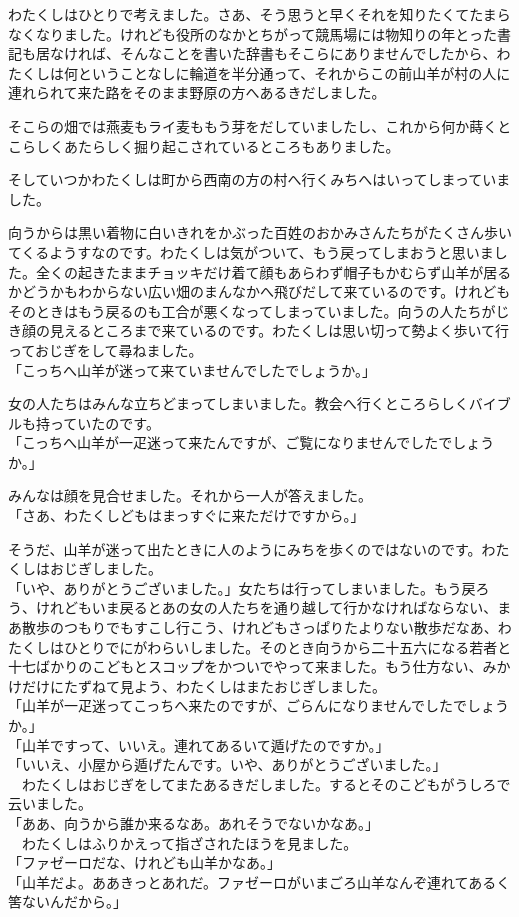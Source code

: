 わたくしはひとりで考えました。さあ、そう思うと早くそれを知りたくてたまらなくなりました。けれども役所のなかとちがって競馬場には物知りの年とった書記も居なければ、そんなことを書いた辞書もそこらにありませんでしたから、わたくしは何ということなしに輪道を半分通って、それからこの前山羊が村の人に連れられて来た路をそのまま野原の方へあるきだしました。

そこらの畑では燕麦もライ麦ももう芽をだしていましたし、これから何か蒔くとこらしくあたらしく掘り起こされているところもありました。

そしていつかわたくしは町から西南の方の村へ行くみちへはいってしまっていました。

向うからは黒い着物に白いきれをかぶった百姓のおかみさんたちがたくさん歩いてくるようすなのです。わたくしは気がついて、もう戻ってしまおうと思いました。全くの起きたままチョッキだけ着て顔もあらわず帽子もかむらず山羊が居るかどうかもわからない広い畑のまんなかへ飛びだして来ているのです。けれどもそのときはもう戻るのも工合が悪くなってしまっていました。向うの人たちがじき顔の見えるところまで来ているのです。わたくしは思い切って勢よく歩いて行っておじぎをして尋ねました。\\
「こっちへ山羊が迷って来ていませんでしたでしょうか。」

女の人たちはみんな立ちどまってしまいました。教会へ行くところらしくバイブルも持っていたのです。\\
「こっちへ山羊が一疋迷って来たんですが、ご覧になりませんでしたでしょうか。」

みんなは顔を見合せました。それから一人が答えました。\\
「さあ、わたくしどもはまっすぐに来ただけですから。」

そうだ、山羊が迷って出たときに人のようにみちを歩くのではないのです。わたくしはおじぎしました。\\
「いや、ありがとうございました。」女たちは行ってしまいました。もう戻ろう、けれどもいま戻るとあの女の人たちを通り越して行かなければならない、まあ散歩のつもりでもすこし行こう、けれどもさっぱりたよりない散歩だなあ、わたくしはひとりでにがわらいしました。そのとき向うから二十五六になる若者と十七ばかりのこどもとスコップをかついでやって来ました。もう仕方ない、みかけだけにたずねて見よう、わたくしはまたおじぎしました。\\
「山羊が一疋迷ってこっちへ来たのですが、ごらんになりませんでしたでしょうか。」\\
「山羊ですって、いいえ。連れてあるいて遁げたのですか。」\\
「いいえ、小屋から遁げたんです。いや、ありがとうございました。」\\
　わたくしはおじぎをしてまたあるきだしました。するとそのこどもがうしろで云いました。\\
「ああ、向うから誰か来るなあ。あれそうでないかなあ。」\\
　わたくしはふりかえって指ざされたほうを見ました。\\
「ファゼーロだな、けれども山羊かなあ。」\\
「山羊だよ。ああきっとあれだ。ファゼーロがいまごろ山羊なんぞ連れてあるく筈ないんだから。」

